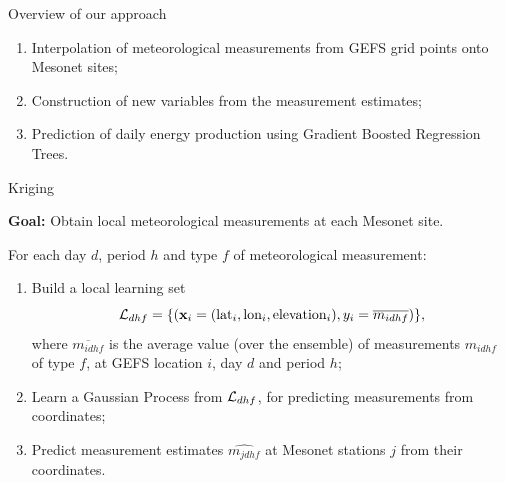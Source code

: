 \documentclass[handout]{beamer}
\begin{document}

\begin{frame}{Overview of our approach}

\begin{enumerate}
\item Interpolation of meteorological measurements from GEFS grid points onto Mesonet sites;
\item Construction of new variables from the measurement estimates;
\item Prediction of daily energy production using Gradient Boosted Regression Trees.
\end{enumerate}

\end{frame}



\begin{frame}{Kriging}

\textbf{Goal:} Obtain local meteorological measurements at each Mesonet site.

\vskip0.25cm

For each day $d$, period $h$ and type $f$ of meteorological measurement:

\begin{enumerate}

\item Build a local learning set $${\cal L}_{dhf} = \{ (\mathbf{x}_i =
(\text{lat}_i, \text{lon}_i, \text{elevation}_i), y_i = \overline{m_{idhf}} )
\},$$  where $\overline{m_{idhf}}$ is the average value (over the ensemble) of
measurements $m_{idhf}$ of type $f$, at GEFS location $i$, day $d$ and period
$h$;

\item Learn a Gaussian Process from ${\cal L}_{dhf}$, for predicting
measurements from coordinates;

\item Predict measurement estimates $\widehat{m_{jdhf}}$ at Mesonet stations
$j$ from their coordinates.

\end{enumerate}

\end{frame}


\end{document}
